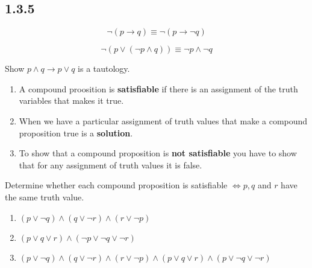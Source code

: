 \documentclass[a4paper, 12pt]{article}
\newenvironment{definition}[1][Definition]{\begin{trivlist}
\item[\hskip \labelsep {\bfseries #1}]}{\end{trivlist}}
\newenvironment{example}[1][Example]{\begin{trivlist}
\item[\hskip \labelsep {\bfseries #1}]}{\end{trivlist}}
\newcommand{\keyword}[1]{\textbf{#1}}
\begin{document}
    \subsection*{1.3.5}
    \begin{example}
        \[\neg (p \rightarrow q) \equiv \neg (p \rightarrow \neg q)\]
    \end{example}
    \begin{example}
        \[\neg (p \vee (\neg p \wedge q )) \equiv \neg p \wedge \neg q\]
    \end{example}
    \begin{example}
        Show $p \wedge q \rightarrow p \vee q$ is a tautology.
    \end{example}
    \begin{definition}
        \begin{enumerate}
            \item A compound proosition is \keyword{satisfiable} if there
            is an assignment of the truth variables that makes it true.
            \item When we have a particular assignment of truth values that
            make a compound proposition true is a \keyword{solution}.
            \item To show that a compound proposition is \keyword{not satisfiable}
            you have to show that for any assignment of truth values it is false.
        \end{enumerate}
    \end{definition}
    \begin{example}
        Determine whether each compound proposition is satisfiable $\iff p, q$
        and $r$ have the same truth value.
        \begin{enumerate}
            \item $(p \vee \neg q) \wedge (q \vee \neg r) \wedge (r \vee \neg p)$
            \item $(p \vee q \vee r) \wedge (\neg p \vee \neg q \vee \neg r)$
            \item $(p \vee \neg q) \wedge (q \vee \neg r) \wedge (r \vee \neg p)
            \wedge (p \vee q \vee r) \wedge (p \vee \neg q \vee \neg r)$
        \end{enumerate}
    \end{example}
\end{document}
